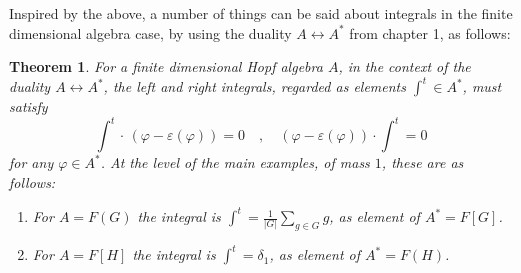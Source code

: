 \documentclass[12pt]{amsbook}
\newtheorem{theorem}{Theorem}[chapter]
\begin{document}
Inspired by the above, a number of things can be said about integrals in the finite dimensional algebra case, by using the duality $A\leftrightarrow A^*$ from chapter 1, as follows:

\begin{theorem}
For a finite dimensional Hopf algebra $A$, in the context of the duality $A\leftrightarrow A^*$, the left and right integrals, regarded as elements $\int^t\in A^*$, must satisfy
$$\int^t\!\!\cdot\,(\varphi-\varepsilon(\varphi))=0\quad,\quad (\varphi-\varepsilon(\varphi))\cdot\!\!\int^t=0$$
for any $\varphi\in A^*$. At the level of the main examples, of mass $1$, these are as follows:
\begin{enumerate}
\item For $A=F(G)$ the integral is $\int^t=\frac{1}{|G|}\sum_{g\in G}g$, as element of $A^*=F[G]$.

\item For $A=F[H]$ the integral is $\int^t=\delta_1$, as element of $A^*=F(H)$.
\end{enumerate}
\end{theorem}
\end{document}
